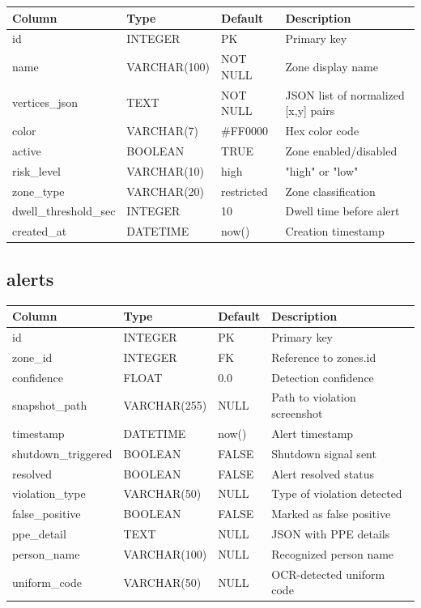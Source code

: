 \documentclass[12pt,a4paper,oneside]{book}
\begin{document}
\begin{tabular}{|l|l|l|p{6cm}|}
    \hline
    \textbf{Column} & \textbf{Type} & \textbf{Default} & \textbf{Description} \\
    \hline
    id & INTEGER & PK & Primary key \\
    \hline
    name & VARCHAR(100) & NOT NULL & Zone display name \\
    \hline
    vertices\_json & TEXT & NOT NULL & JSON list of normalized [x,y] pairs \\
    \hline
    color & VARCHAR(7) & \#FF0000 & Hex color code \\
    \hline
    active & BOOLEAN & TRUE & Zone enabled/disabled \\
    \hline
    risk\_level & VARCHAR(10) & high & "high" or "low" \\
    \hline
    zone\_type & VARCHAR(20) & restricted & Zone classification \\
    \hline
    dwell\_threshold\_sec & INTEGER & 10 & Dwell time before alert \\
    \hline
    created\_at & DATETIME & now() & Creation timestamp \\
    \hline
\end{tabular}

\subsection{alerts}

\begin{tabular}{|l|l|l|p{6cm}|}
    \hline
    \textbf{Column} & \textbf{Type} & \textbf{Default} & \textbf{Description} \\
    \hline
    id & INTEGER & PK & Primary key \\
    \hline
    zone\_id & INTEGER & FK & Reference to zones.id \\
    \hline
    confidence & FLOAT & 0.0 & Detection confidence \\
    \hline
    snapshot\_path & VARCHAR(255) & NULL & Path to violation screenshot \\
    \hline
    timestamp & DATETIME & now() & Alert timestamp \\
    \hline
    shutdown\_triggered & BOOLEAN & FALSE & Shutdown signal sent \\
    \hline
    resolved & BOOLEAN & FALSE & Alert resolved status \\
    \hline
    violation\_type & VARCHAR(50) & NULL & Type of violation detected \\
    \hline
    false\_positive & BOOLEAN & FALSE & Marked as false positive \\
    \hline
    ppe\_detail & TEXT & NULL & JSON with PPE details \\
    \hline
    person\_name & VARCHAR(100) & NULL & Recognized person name \\
    \hline
    uniform\_code & VARCHAR(50) & NULL & OCR-detected uniform code \\
    \hline
\end{tabular}
\end{document}
